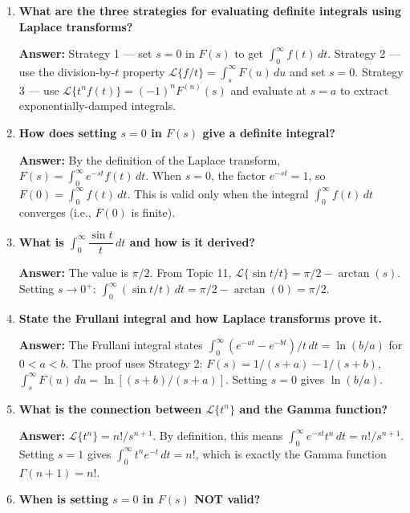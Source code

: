 \documentclass[12pt,a4paper]{article}
\begin{document}
\begin{enumerate}[label=\textbf{Q\arabic*.}, leftmargin=*, itemsep=1.2em]

\item \textbf{What are the three strategies for evaluating definite integrals
      using Laplace transforms?}

\textbf{Answer:} Strategy 1 --- set $s = 0$ in $F(s)$ to get
$\int_0^\infty f(t)\,dt$. Strategy 2 --- use the division-by-$t$ property
$\mathcal{L}\{f/t\} = \int_s^\infty F(u)\,du$ and set $s = 0$. Strategy 3 ---
use $\mathcal{L}\{t^n f(t)\} = (-1)^n F^{(n)}(s)$ and evaluate at $s = a$ to
extract exponentially-damped integrals.

\item \textbf{How does setting $s = 0$ in $F(s)$ give a definite integral?}

\textbf{Answer:} By the definition of the Laplace transform,
$F(s) = \int_0^\infty e^{-st} f(t)\,dt$. When $s = 0$, the factor $e^{-st} = 1$,
so $F(0) = \int_0^\infty f(t)\,dt$. This is valid only when the integral
$\int_0^\infty f(t)\,dt$ converges (i.e., $F(0)$ is finite).

\item \textbf{What is $\int_0^\infty \dfrac{\sin t}{t}\,dt$ and how is it
      derived?}

\textbf{Answer:} The value is $\pi/2$. From Topic 11,
$\mathcal{L}\{\sin t/t\} = \pi/2 - \arctan(s)$. Setting $s \to 0^+$:
$\int_0^\infty (\sin t/t)\,dt = \pi/2 - \arctan(0) = \pi/2$.

\item \textbf{State the Frullani integral and how Laplace transforms prove it.}

\textbf{Answer:} The Frullani integral states
$\int_0^\infty (e^{-at} - e^{-bt})/t\,dt = \ln(b/a)$ for $0 < a < b$.
The proof uses Strategy 2: $F(s) = 1/(s+a) - 1/(s+b)$,
$\int_s^\infty F(u)\,du = \ln[(s+b)/(s+a)]$. Setting $s = 0$ gives
$\ln(b/a)$.

\item \textbf{What is the connection between $\mathcal{L}\{t^n\}$ and the
      Gamma function?}

\textbf{Answer:} $\mathcal{L}\{t^n\} = n!/s^{n+1}$. By definition, this means
$\int_0^\infty e^{-st} t^n\,dt = n!/s^{n+1}$. Setting $s = 1$ gives
$\int_0^\infty t^n e^{-t}\,dt = n!$, which is exactly the Gamma function
$\Gamma(n+1) = n!$.

\item \textbf{When is setting $s = 0$ in $F(s)$ NOT valid?}


\end{enumerate}
\end{document}
